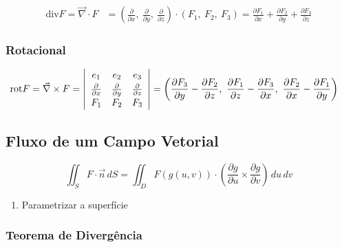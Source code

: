 \documentclass[11pt, a4paper]{article}
\begin{document}
\begin{align*}
    \text{div} F = \vec{\nabla} \cdot F & = \left(\frac{\partial}{\partial x}
    ,\ \frac{\partial}{\partial y}
    ,\ \frac{\partial}{\partial z}\right)
    \cdot (F_1,\ F_2,\ F_3)
    = \frac{\partial F_1}{\partial x}
    + \frac{\partial F_2}{\partial y}
    + \frac{\partial F_3}{\partial z}
\end{align*}

\subsubsection{Rotacional}

\begin{align*}
    \text{rot} F = \vec{\nabla} \times F & =
    \left\vert
    \begin{array}{c c c}
        e_1                         & e_2 & e_3 \\[2pt]
        \frac{\partial}{\partial x} &
        \frac{\partial}{\partial y} &
        \frac{\partial}{\partial z}             \\[2pt]
        F_1                         & F_2 & F_3
    \end{array}
    \right\vert
    = \left(\frac{\partial F_3}{\partial y} - \frac{\partial F_2}{\partial z}
    ,\ \frac{\partial F_1}{\partial z} - \frac{\partial F_3}{\partial x}
    ,\ \frac{\partial F_2}{\partial x} - \frac{\partial F_1}{\partial y}
    \right)
\end{align*}

\subsection{Fluxo de um Campo Vetorial}

\begin{equation*}
    \iint_S F \cdot \vec{n} \, dS =
    \iint_D F(g(u, v)) \cdot
    \left(
    \frac{\partial g}{\partial u} \times \frac{\partial g}{\partial v}
    \right) \, du\,dv
\end{equation*}

\begin{enumerate}
    \item Parametrizar a superfície
\end{enumerate}

\subsubsection{Teorema de Divergência}
\end{document}

